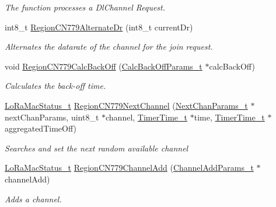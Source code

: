 \begin{DoxyCompactItemize}
\begin{DoxyCompactList}\small\item\em The function processes a Dl\+Channel Request. \end{DoxyCompactList}\item 
int8\+\_\+t \mbox{\hyperlink{group___r_e_g_i_o_n_c_n779_gaf8880a4368c2404e9d629205e9dc769b}{Region\+C\+N779\+Alternate\+Dr}} (int8\+\_\+t current\+Dr)
\begin{DoxyCompactList}\small\item\em Alternates the datarate of the channel for the join request. \end{DoxyCompactList}\item 
void \mbox{\hyperlink{group___r_e_g_i_o_n_c_n779_ga159d16a30e948dcab70399897672848b}{Region\+C\+N779\+Calc\+Back\+Off}} (\mbox{\hyperlink{group___r_e_g_i_o_n_ga7c5c9a8da174e6679eded8257dc92fd9}{Calc\+Back\+Off\+Params\+\_\+t}} $\ast$calc\+Back\+Off)
\begin{DoxyCompactList}\small\item\em Calculates the back-\/off time. \end{DoxyCompactList}\item 
\mbox{\hyperlink{group___l_o_r_a_m_a_c_ga30bd25657e10480f8605ee951b0ecfbd}{Lo\+Ra\+Mac\+Status\+\_\+t}} \mbox{\hyperlink{group___r_e_g_i_o_n_c_n779_ga37a1c6f7657dd872a54e0573c5f554f3}{Region\+C\+N779\+Next\+Channel}} (\mbox{\hyperlink{group___r_e_g_i_o_n_ga115f5e83afae352c0a3dcdc193374040}{Next\+Chan\+Params\+\_\+t}} $\ast$next\+Chan\+Params, uint8\+\_\+t $\ast$channel, \mbox{\hyperlink{utilities_8h_a4215ca43d3e953099ea758ce428599d0}{Timer\+Time\+\_\+t}} $\ast$time, \mbox{\hyperlink{utilities_8h_a4215ca43d3e953099ea758ce428599d0}{Timer\+Time\+\_\+t}} $\ast$aggregated\+Time\+Off)
\begin{DoxyCompactList}\small\item\em Searches and set the next random available channel \end{DoxyCompactList}\item 
\mbox{\hyperlink{group___l_o_r_a_m_a_c_ga30bd25657e10480f8605ee951b0ecfbd}{Lo\+Ra\+Mac\+Status\+\_\+t}} \mbox{\hyperlink{group___r_e_g_i_o_n_c_n779_ga087a9e4729bae8b825db62caca5f20d2}{Region\+C\+N779\+Channel\+Add}} (\mbox{\hyperlink{group___r_e_g_i_o_n_gab1c5f3aa06614283202906cef4417860}{Channel\+Add\+Params\+\_\+t}} $\ast$channel\+Add)
\begin{DoxyCompactList}\small\item\em Adds a channel. \end{DoxyCompactList}\item 

\end{DoxyCompactItemize}
